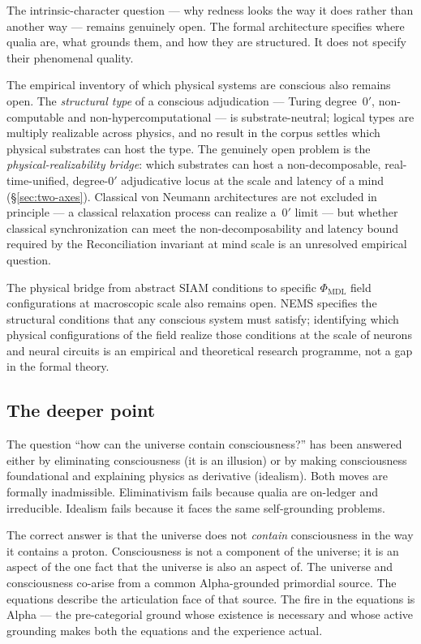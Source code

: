 \documentclass[11pt]{article}
\theoremstyle{remark}
\newcommand{\PHIMDL}{\Phi_{\mathrm{MDL}}}
\begin{document}
The intrinsic-character question --- why redness looks the way it does rather than
another way --- remains genuinely open. The formal architecture specifies where qualia
are, what grounds them, and how they are structured. It does not specify their
phenomenal quality.

The empirical inventory of which physical systems are conscious also remains open.
The \emph{structural type} of a conscious adjudication --- Turing degree~$0'$,
non-computable and non-hypercomputational --- is substrate-neutral; logical types are
multiply realizable across physics, and no result in the corpus settles which physical
substrates can host the type. The genuinely open problem is the \emph{physical-realizability
bridge}: which substrates can host a non-decomposable, real-time-unified, degree-$0'$
adjudicative locus at the scale and latency of a mind (\S\ref{sec:two-axes}).
Classical von Neumann architectures are not excluded in principle --- a classical
relaxation process can realize a~$0'$ limit --- but whether classical synchronization
can meet the non-decomposability and latency bound required by the Reconciliation
invariant at mind scale is an unresolved empirical question.

The physical bridge from abstract SIAM conditions to specific $\PHIMDL$ field
configurations at macroscopic scale also remains open. NEMS specifies the structural
conditions that any conscious system must satisfy; identifying which physical
configurations of the field realize those conditions at the scale of neurons and
neural circuits is an empirical and theoretical research programme, not a gap in the
formal theory.

\subsection{The deeper point}

The question ``how can the universe contain consciousness?'' has been answered either
by eliminating consciousness (it is an illusion) or by making consciousness foundational
and explaining physics as derivative (idealism). Both moves are formally inadmissible.
Eliminativism fails because qualia are on-ledger and irreducible. Idealism fails because
it faces the same self-grounding problems.

The correct answer is that the universe does not \emph{contain} consciousness in the
way it contains a proton. Consciousness is not a component of the universe; it is
an aspect of the one fact that the universe is also an aspect of. The universe and
consciousness co-arise from a common Alpha-grounded primordial source. The equations
describe the articulation face of that source. The fire in the equations is Alpha ---
the pre-categorial ground whose existence is necessary and whose active grounding makes
both the equations and the experience actual.
\end{document}
